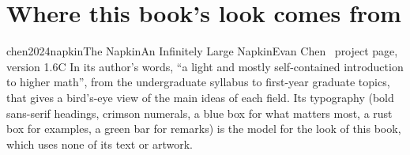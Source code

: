\section{Where this book's look comes from}
\label{sec:reading-look}

\begin{webcard}[Book]{chen2024napkin}{The Napkin}{An Infinitely Large Napkin}{Evan Chen \textperiodcentered\ project page, version 1.6}{C}
 In its author's words, ``a light and mostly self-contained introduction to higher math'', from the
undergraduate syllabus to first-year graduate topics, that gives a bird's-eye view of the main ideas of each field.
 Its typography (bold sans-serif headings, crimson numerals, a blue box for what matters
most, a rust box for examples, a green bar for remarks) is the model for the look of this book, which uses none of
its text or artwork.
\end{webcard}
